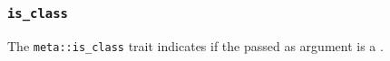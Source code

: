 
\subsubsection{\texttt{is\_class}}

The \texttt{meta::is\_class}
trait indicates if the  passed as argument is a .


